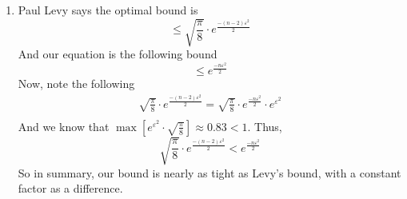 \documentclass[11pt]{article}
\begin{document}
\begin{enumerate}
\begin{proof}
\begin{subequations}
\begin{equation}
			\frac{Vol(C(K))}{n} = \sigma(K)
		\end{equation}
		\begin{equation}
			\frac{Vol(B^n(0, 1))}{n}= \sigma(S^{n-1}(1))
		\end{equation}
		\begin{equation}
			\mu^{n-1}(K) = \frac{\sigma(K)}{\sigma(S^{n-1}(1))}
		\end{equation}
	\end{subequations}
	And so, we can use \ref{eqn:ineq} to do the following
	\begin{align*}
	Vol(C(K)) &\le e^{\frac{-n \varepsilon^2}{2}} Vol(B^n(0, 1)) \\
	\sigma(K) \cdot n &\le e^{\frac{-n \varepsilon^2}{2}} \sigma(S^{n-1}(1)) \cdot n \\
	\implies \frac{\sigma(K)}{\sigma(S^{n-1}(1))} &\le e^{\frac{-n \varepsilon^2}{2}} \\
	\implies \mu^{n-1}(K) &\le  e^{\frac{-n \varepsilon^2}{2}} \\
	\implies \mu^{n-1}(K(x_0, \varepsilon)) &\le  e^{\frac{-n \varepsilon^2}{2}} \hspace{0.5cm}\text{(notation)}
	\end{align*}
	\end{proof}
	\item Paul Levy says the optimal bound is
	\begin{equation}
		\le \sqrt{\frac{\pi}{8}} \cdot e^{\frac{-(n - 2)\varepsilon^2}{2}}
	\end{equation}
	And our equation is the following bound
	\begin{equation}
		\le e^{\frac{-n \varepsilon^2}{2}}
	\end{equation}
	Now, note the following
	\begin{align*}
		\sqrt{\frac{\pi}{8}} \cdot e^{\frac{-(n - 2)\varepsilon^2}{2}} = \sqrt{\frac{\pi}{8}} \cdot e^{\frac{-n \varepsilon^2}{2}} \cdot e^{\varepsilon^2} \\
	\end{align*}
	And we know that $ \max \left[ e^{\varepsilon^2} \cdot \sqrt{\frac{\pi}{8}} \right] \approx 0.83 < 1$. Thus,
	\begin{equation}
	\sqrt{\frac{\pi}{8}} \cdot e^{\frac{-(n - 2)\varepsilon^2}{2}} < e^{\frac{-n \varepsilon^2}{2}}
	\end{equation}
	So in summary, our bound is nearly as tight as Levy's bound, with a constant factor as a difference.
\end{enumerate}
\begin{center}
\end{center}
\end{document}
